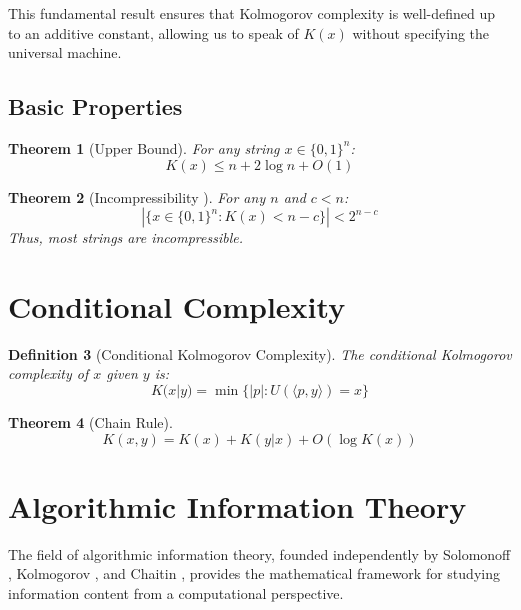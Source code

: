 \documentclass[12pt,a4paper]{report}
\newtheorem{theorem}{Theorem}[chapter]
\newtheorem{definition}[theorem]{Definition}
\begin{document}
This fundamental result ensures that Kolmogorov complexity is well-defined up to an additive constant, allowing us to speak of $K(x)$ without specifying the universal machine.

\subsection{Basic Properties}

\begin{theorem}[Upper Bound]
For any string $x \in \{0,1\}^n$:
\begin{equation}
K(x) \leq n + 2\log n + O(1)
\end{equation}
\end{theorem}

\begin{theorem}[Incompressibility \cite{li2008introduction}]
For any $n$ and $c < n$:
\begin{equation}
|\{x \in \{0,1\}^n : K(x) < n - c\}| < 2^{n-c}
\end{equation}
Thus, most strings are incompressible.
\end{theorem}

\section{Conditional Complexity}

\begin{definition}[Conditional Kolmogorov Complexity]
The conditional Kolmogorov complexity of $x$ given $y$ is:
\begin{equation}
K(x|y) = \min\{|p| : U(\langle p, y \rangle) = x\}
\end{equation}
\end{definition}

\begin{theorem}[Chain Rule]
\begin{equation}
K(x, y) = K(x) + K(y|x) + O(\log K(x))
\end{equation}
\end{theorem}

\section{Algorithmic Information Theory}

The field of algorithmic information theory, founded independently by Solomonoff \cite{solomonoff1964formal}, Kolmogorov \cite{kolmogorov1965three}, and Chaitin \cite{chaitin1966length}, provides the mathematical framework for studying information content from a computational perspective.
\end{document}
